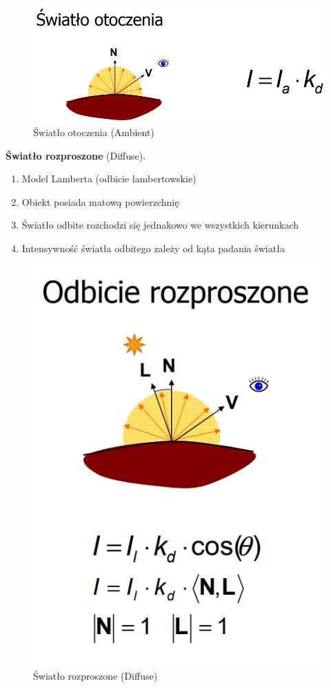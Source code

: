\documentclass[12pt]{article}
\begin{document}
\begin{figure}[H]
	\centering
	\includegraphics[scale=0.5]{Pictures/ambient.png}
	\caption{Światło otoczenia (Ambient)}
\end{figure}

\textbf{Światło rozproszone} (Diffuse).
\begin{enumerate}
\item Model Lamberta (odbicie lambertowskie)
\item Obiekt posiada matową powierzchnię
\item Światło odbite rozchodzi się jednakowo we wszystkich kierunkach
\item Intensywność światła odbitego zależy od kąta padania światła
\end{enumerate}

\begin{figure}[H]
	\centering
	\includegraphics[scale=0.5]{Pictures/diffuse.png}
	\caption{Światło rozproszone (Diffuse)}
\end{figure}
\end{document}
